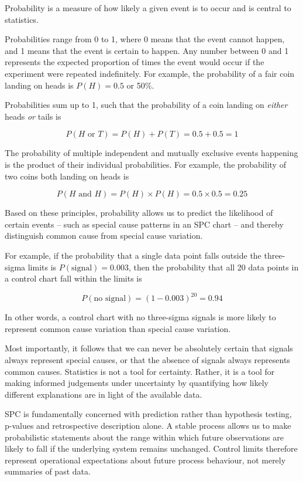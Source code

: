 \documentclass[
]{book}
\begin{document}
Probability is a measure of how likely a given event is to occur and is central to statistics.

Probabilities range from 0 to 1, where 0 means that the event cannot happen, and 1 means that the event is certain to happen. Any number between 0 and 1 represents the expected proportion of times the event would occur if the experiment were repeated indefinitely. For example, the probability of a fair coin landing on heads is \(P(H) = 0.5\) or 50\%.

Probabilities sum up to 1, such that the probability of a coin landing on \emph{either} heads \emph{or} tails is

\[P(H \text{ or } T) = P(H) + P(T) = 0.5 + 0.5 = 1\]

The probability of multiple independent and mutually exclusive events happening is the product of their individual probabilities. For example, the probability of two coins both landing on heads is

\[P(H \text{ and } H) = P(H) \times P(H) = 0.5 \times 0.5 = 0.25\]

Based on these principles, probability allows us to predict the likelihood of certain events -- such as special cause patterns in an SPC chart -- and thereby distinguish common cause from special cause variation.

For example, if the probability that a single data point falls outside the three-sigma limits is \(P(\text{signal}) = 0.003\), then the probability that all 20 data points in a control chart fall within the limits is

\[P(\text{no signal}) = (1-0.003)^{20} = 0.94\]

In other words, a control chart with no three-sigma signals is more likely to represent common cause variation than special cause variation.

Most importantly, it follows that we can never be absolutely certain that signals always represent special causes, or that the absence of signals always represents common causes. Statistics is not a tool for certainty. Rather, it is a tool for making informed judgements under uncertainty by quantifying how likely different explanations are in light of the available data.

SPC is fundamentally concerned with prediction rather than hypothesis testing, p-values and retrospective description alone. A stable process allows us to make probabilistic statements about the range within which future observations are likely to fall if the underlying system remains unchanged. Control limits therefore represent operational expectations about future process behaviour, not merely summaries of past data.
\end{document}
